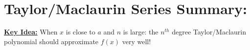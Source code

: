 

\title{\mySubTitle}\date{}
\maketitle


\hspace*{-.8in}%

\setlength{\columnseprule}{.4pt}
\setlength{\columnsep}{3em}

\section*{Taylor/Maclaurin Series Summary:}
\textbf{\underline{\large Key Idea:}}
When \(x\) is close to \(a\) and \(n\) is large: the \(n^{th}\) degree Taylor/Maclaurin polynomial should approximate \(f(x)\) very well!\\

\vspace*{.2in}







%
%
%
%
%

\pagebreak

